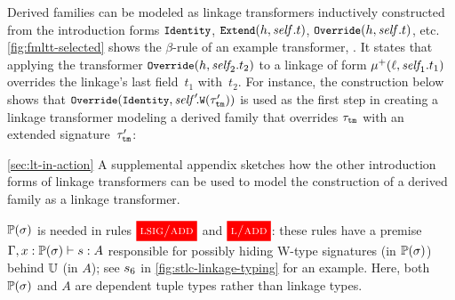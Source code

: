 Derived families can be modeled as linkage transformers inductively
constructed from the introduction forms
$\small\texttt{Identity}$, $\small\texttt{Extend}({h},{\mathit{self}.t})$, $\small\texttt{Override}({h},{\mathit{self}.t})$, %
etc.
\cref{fig:fmltt-selected} shows the $\beta$-rule of an example transformer,
.
It states that applying the transformer $\small\texttt{Override}({h},{\mathit{self}_{\!2}.t_2})$ to
a linkage of form $\mu^+({\ell},{\mathit{self}_{\!1}.t_1})$
overrides the linkage's last field~$t_1$ with~$t_2$.
For instance, the construction below shows that 
$\small\texttt{Override}({\texttt{Identity}},{\mathit{self}'\!.\texttt{W}({\tau'_{\texttt{tm}}})})$
is used as the first step in creating a linkage transformer modeling a derived family that
overrides $\tau_{\texttt{tm}}$ with an extended
signature~$\tau'_{\texttt{tm}}$:
\vspace{.9ex}

\noindent


\noindent
\ifreport \cref{sec:lt-in-action}
\else A supplemental appendix
\fi
sketches how the other introduction forms of linkage transformers
can be used to model the construction of a derived family as a linkage transformer.


%

$\mathbb{P}({\sigma})$ is needed in rules $\ruleref{lsig/add}$ and $\ruleref{l/add}$:
these rules have a premise  $ {\Gamma,x : \mathbb{P}({\sigma})} \vdash {\ensuremath{s}} : {A} $
responsible for possibly hiding W-type signatures (in $\mathbb{P}({\sigma})$) behind $\mathbb{U}$ (in $A$);
see $s_6$ in \cref{fig:stlc-linkage-typing} for an example.
Here, both $\mathbb{P}({\sigma})$ and $A$ are dependent tuple types rather than linkage types.


